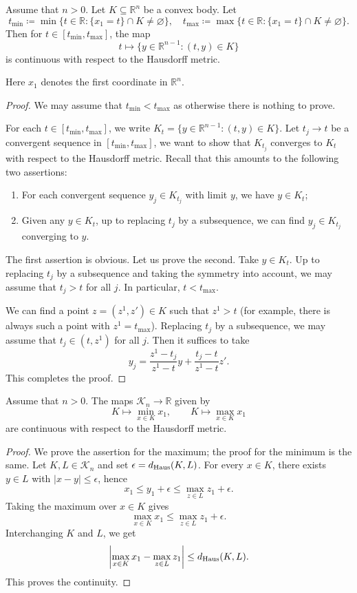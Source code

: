 \begin{lemma}\label{lma:Hausdorffconvslice}
    Assume that $n>0$.
    Let $K\subseteq \mathbb{R}^n$ be a convex body. Let
    \[
    t_{\min}\coloneqq \min \{t\in \mathbb{R}:\{x_1=t\}\cap K\neq \varnothing\},\quad t_{\max}\coloneqq \max \{t\in \mathbb{R}:\{x_1=t\}\cap K\neq \varnothing\}.
    \]
    Then for $t\in [t_{\min},t_{\max}]$, the map
    \[
    t\mapsto \{y\in \mathbb{R}^{n-1}:(t,y)\in K\}
    \]
    is continuous with respect to the Hausdorff metric.
\end{lemma}
Here $x_1$ denotes the first coordinate in $\mathbb{R}^n$.
\begin{proof}
We may assume that $t_{\min}<t_{\max}$ as otherwise there is nothing to prove.

For each $t\in [t_{\min},t_{\max}]$, we write $K_t=\{y\in \mathbb{R}^{n-1}:(t,y)\in K\}$.
Let $t_j\to t$ be a convergent sequence in $[t_{\min},t_{\max}]$, we want to show that $K_{t_j}$ converges to $K_t$ with respect to the Hausdorff metric. Recall that this amounts to the following two assertions:
\begin{enumerate}
    \item\label{itm:appendix-Okounkov:L87:1} For each convergent sequence $y_j\in K_{t_j}$ with limit $y$, we have $y\in K_t$;
    \item\label{itm:appendix-Okounkov:L87:2} Given any $y\in K_t$, up to replacing $t_j$ by a subsequence, we can find $y_j\in K_{t_j}$ converging to $y$.
\end{enumerate}
The first assertion is obvious. Let us prove the second. Take $y\in K_t$. Up to replacing $t_j$ by a subsequence and taking the symmetry into account, we may assume that $t_j> t$ for all $j$. In particular, $t<t_{\max}$.

We can find a point $z=(z^1,z')\in K$ such that $z^1>t$ (for example, there is always such a point with $z^1=t_{\max}$). Replacing $t_j$ by a subsequence, we may assume that $t_j\in (t,z^1)$ for all $j$. Then it suffices to take
\[
y_j=\frac{z^1-t_j}{z^1-t}y+\frac{t_j-t}{z^1-t}z'.
\]
This completes the proof.
\end{proof}


\begin{lemma}\label{lma:Hausdorffconvcoordbounds}
    Assume that $n>0$. The maps $\mathcal{K}_n\rightarrow \mathbb{R}$ given by
    \[
        K\mapsto \min_{x\in K}x_1,\qquad K\mapsto \max_{x\in K}x_1
    \]
    are continuous with respect to the Hausdorff metric.
\end{lemma}
\begin{proof}
    We prove the assertion for the maximum; the proof for the minimum is the same.
    Let $K,L\in \mathcal{K}_n$ and set $\epsilon=d_{\mathrm{Haus}}(K,L)$.
    For every $x\in K$, there exists $y\in L$ with $|x-y|\leq \epsilon$, hence
    \[
        x_1\leq y_1+\epsilon\leq \max_{z\in L}z_1+\epsilon.
    \]
    Taking the maximum over $x\in K$ gives
    \[
        \max_{x\in K}x_1\leq \max_{z\in L}z_1+\epsilon.
    \]
    Interchanging $K$ and $L$, we get
    \[
        \left|\max_{x\in K}x_1-\max_{z\in L}z_1\right|\leq d_{\mathrm{Haus}}(K,L).
    \]
    This proves the continuity.
\end{proof}


